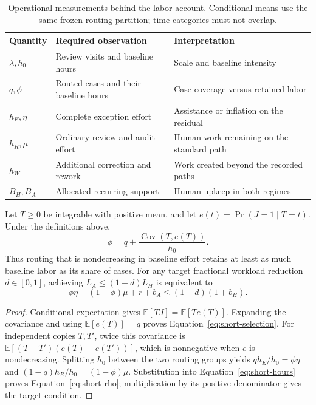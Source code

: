 \begin{table}[!htb]
\centering\small
\caption{Operational measurements behind the labor account. Conditional means use the same
frozen routing partition; time categories must not overlap.}
\label{tab:labor-measurement}
\begin{tabularx}{\linewidth}{@{}P{2.5cm}LL@{}}
\toprule
Quantity & Required observation & Interpretation\\
\midrule
$\lambda,h_0$ & Review visits and baseline hours & Scale and baseline intensity\\
$q,\phi$ & Routed cases and their baseline hours & Case coverage versus retained labor\\
$h_E,\eta$ & Complete exception effort & Assistance or inflation on the residual\\
$h_R,\mu$ & Ordinary review and audit effort & Human work remaining on the standard path\\
$h_W$ & Additional correction and rework & Work created beyond the recorded paths\\
$B_H,B_A$ & Allocated recurring support & Human upkeep in both regimes\\
\bottomrule
\end{tabularx}
\end{table}

\begin{proposition}
\label{prop:short-frontier}
Let $T\ge0$ be integrable with positive mean, and let
$e(t)=\Pr(J=1\mid T=t)$. Under the definitions above,
\begin{equation}
 \phi=q+\frac{\operatorname{Cov}(T,e(T))}{h_0}.
 \label{eq:short-selection}
\end{equation}
Thus routing that is nondecreasing in baseline effort retains at least as much baseline
labor as its share of cases. For any target fractional workload reduction $d\in[0,1]$,
achieving $L_A\le(1-d)L_H$ is equivalent to
\begin{equation}
 \phi\eta+(1-\phi)\mu+r+b_A\le(1-d)(1+b_H).
 \label{eq:short-target}
\end{equation}
\end{proposition}
\begin{proof}
Conditional expectation gives $\mathbb E[TJ]=\mathbb E[Te(T)]$. Expanding the covariance
and using $\mathbb E[e(T)]=q$ proves Equation~\eqref{eq:short-selection}. For independent
copies $T,T'$, twice this covariance is
$\mathbb E[(T-T')(e(T)-e(T'))]$, which is nonnegative when $e$ is nondecreasing.
Splitting $h_0$ between the two routing groups yields
$qh_E/h_0=\phi\eta$ and $(1-q)h_R/h_0=(1-\phi)\mu$.
Substitution into Equation~\eqref{eq:short-hours} proves
Equation~\eqref{eq:short-rho}; multiplication by its positive denominator gives the target
condition.
\end{proof}

